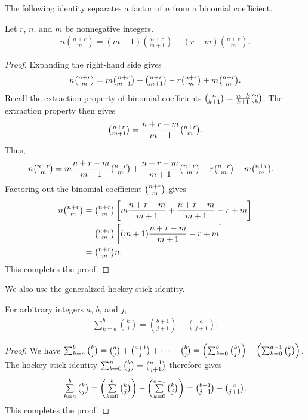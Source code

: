 The following identity separates a factor of $n$ from a binomial coefficient.
\begin{lemma}
  \label{lem:binomial-decomposition}
  Let $r$, $n$, and $m$ be nonnegative integers.
  \begin{align*}
    n \binom{n+r}{m} = (m+1) \binom{n+r}{m+1} - (r-m) \binom{n+r}{m}.
  \end{align*}
  \begin{proof}
    Expanding the right-hand side gives
    \begin{align*}
      n \tbinom{n+r}{m}
      = m \tbinom{n+r}{m+1} + \tbinom{n+r}{m+1} - r \tbinom{n+r}{m}
      + m \tbinom{n+r}{m}.
    \end{align*}
    Recall the extraction property of binomial coefficients
    $\tbinom{n}{k+1} = \frac{n-k}{k+1} \tbinom{n}{k}$.
    The extraction property then gives
    \begin{align*}
      \tbinom{n+r}{m+1} = \frac{n+r-m}{m+1} \tbinom{n+r}{m}.
    \end{align*}
    Thus,
    \begin{align*}
      n \tbinom{n+r}{m}
      &= m \frac{n+r-m}{m+1} \tbinom{n+r}{m}
      + \frac{n+r-m}{m+1} \tbinom{n+r}{m}
      - r \tbinom{n+r}{m} + m \tbinom{n+r}{m}.
    \end{align*}
    Factoring out the binomial coefficient $\tbinom{n+r}{m}$ gives
    \begin{align*}
      n \tbinom{n+r}{m}
      &= \tbinom{n+r}{m} \left[ m \frac{n+r-m}{m+1} + \frac{n+r-m}{m+1} - r + m \right] \\
      &= \tbinom{n+r}{m} \left[ (m+1) \frac{n+r-m}{m+1} - r + m \right] \\
      &= \tbinom{n+r}{m}n.
    \end{align*}
    This completes the proof.
  \end{proof}
\end{lemma}
We also use the generalized hockey-stick identity.
\begin{lemma}
  \label{lem:generalized-hockey-stick-identity}
  For arbitrary integers $a$, $b$, and $j$,
  \begin{align*}
    \sum_{k=a}^{b} \binom{k}{j} = \binom{b+1}{j+1} - \binom{a}{j+1}.
  \end{align*}
  \begin{proof}
    We have
    $\mathop{\textstyle\sum}_{k=a}^{b} \tbinom{k}{j}
    = \tbinom{a}{j} + \tbinom{a+1}{j} + \cdots + \tbinom{b}{j}
    = \left( \mathop{\textstyle\sum}_{k=0}^{b} \tbinom{k}{j} \right) - \left( \mathop{\textstyle\sum}_{k=0}^{a-1} \tbinom{k}{j} \right)$.
    The hockey-stick identity $\mathop{\textstyle\sum}_{k=0}^{n} \tbinom{k}{j} = \tbinom{n+1}{j+1}$ therefore gives
    \begin{align*}
      \mathop{\textstyle\sum}_{k=a}^{b} \tbinom{k}{j}
      = \left( \mathop{\textstyle\sum}_{k=0}^{b} \tbinom{k}{j} \right) - \left( \mathop{\textstyle\sum}_{k=0}^{a-1} \tbinom{k}{j} \right)
      = \tbinom{b+1}{j+1} - \tbinom{a}{j+1}.
    \end{align*}
    This completes the proof.
  \end{proof}
\end{lemma}
